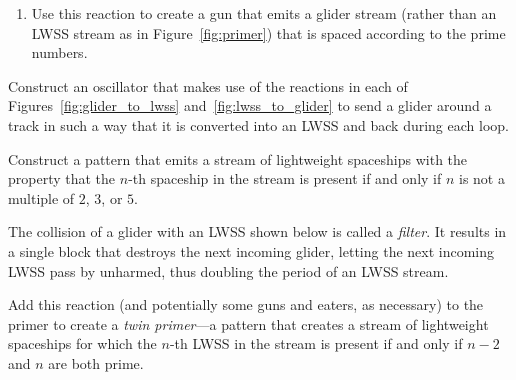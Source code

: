 \begin{multicols}{2}
\begin{problem}
\begin{enumerate}[label=\bf\color{ocre}(\alph*)]
			\item {} Use this reaction to create a gun that emits a glider stream (rather than an LWSS stream as in Figure~\ref{fig:primer}) that is spaced according to the prime numbers.
		\end{enumerate}
	\end{problem}
	
	
	\mfilbreak
	
	
	\begin{problem}\label{exer:glider_to_lwss_loop} 
		Construct an oscillator that makes use of the reactions in each of Figures~\ref{fig:glider_to_lwss} and~\ref{fig:lwss_to_glider} to send a glider around a track in such a way that it is converted into an LWSS and back during each loop.
	\end{problem}
	
	
	\mfilbreak
	
	
	\begin{problem}\label{exer:period_not_235_gun} 
		Construct a pattern that emits a stream of lightweight spaceships with the property that the $n$-th spaceship in the stream is present if and only if $n$ is not a multiple of $2$, $3$, or $5$.
	\end{problem}
	
	
	\mfilbreak
	
	
	\begin{problem}\label{exer:twin_primer} 
		The collision of a glider with an LWSS shown below is called a \emph{filter}. It results in a single block that destroys the next incoming glider, letting the next incoming LWSS pass by unharmed, thus doubling the period of an LWSS stream.
		
		\begin{center}
		\end{center}
		
		\noindent Add this reaction (and potentially some guns and eaters, as necessary) to the primer to create a \emph{twin primer}---a pattern that creates a stream of lightweight spaceships for which the $n$-th LWSS in the stream is present if and only if $n-2$ and $n$ are both prime.
	\end{problem}



\end{multicols}
